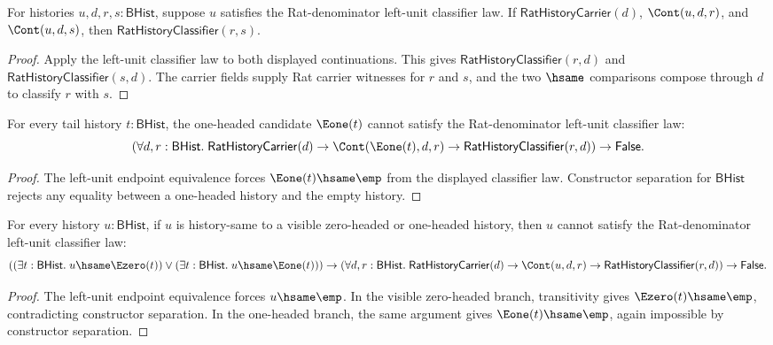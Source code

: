 \begin{lemma}
\label{lem:field-rat-denominator-continuation-left-unit-result-classifier}
For histories $u,d,r,s:\mathsf{BHist}$, suppose $u$ satisfies the
Rat-denominator left-unit classifier law. If $\mathsf{RatHistoryCarrier}(d)$,
$\Cont(u,d,r)$, and $\Cont(u,d,s)$, then
$\mathsf{RatHistoryClassifier}(r,s)$.
\end{lemma}
\begin{proof}
Apply the left-unit classifier law to both displayed continuations. This gives
$\mathsf{RatHistoryClassifier}(r,d)$ and
$\mathsf{RatHistoryClassifier}(s,d)$. The carrier fields supply Rat carrier
witnesses for $r$ and $s$, and the two $\hsame$ comparisons compose through
$d$ to classify $r$ with $s$.
\end{proof}

\begin{theorem}
\label{thm:field-rat-denominator-continuation-e1-left-unit-law-absurd}
For every tail history $t:\mathsf{BHist}$, the one-headed candidate
$\Eone(t)$ cannot satisfy the Rat-denominator left-unit classifier law:
$$
\left(
\forall d,r:\mathsf{BHist}.\;
\mathsf{RatHistoryCarrier}(d)\to
\Cont(\Eone(t),d,r)\to
\mathsf{RatHistoryClassifier}(r,d)
\right)
\to \mathsf{False}.
$$
\end{theorem}
\begin{proof}
The left-unit endpoint equivalence forces $\Eone(t)\hsame\emp$ from the
displayed classifier law. Constructor separation for $\mathsf{BHist}$ rejects
any equality between a one-headed history and the empty history.
\end{proof}

\begin{theorem}
\label{thm:field-rat-denominator-continuation-visible-left-unit-law-absurd}
For every history $u:\mathsf{BHist}$, if $u$ is history-same to a visible
zero-headed or one-headed history, then $u$ cannot satisfy the
Rat-denominator left-unit classifier law:
$$
\left(
(\exists t:\mathsf{BHist}.\; u\hsame\Ezero(t))
\lor
(\exists t:\mathsf{BHist}.\; u\hsame\Eone(t))
\right)
\to
\left(
\forall d,r:\mathsf{BHist}.\;
\mathsf{RatHistoryCarrier}(d)\to
\Cont(u,d,r)\to
\mathsf{RatHistoryClassifier}(r,d)
\right)
\to \mathsf{False}.
$$
\end{theorem}
\begin{proof}
The left-unit endpoint equivalence forces $u\hsame\emp$. In the visible
zero-headed branch, transitivity gives $\Ezero(t)\hsame\emp$, contradicting
constructor separation. In the one-headed branch, the same argument gives
$\Eone(t)\hsame\emp$, again impossible by constructor separation.
\end{proof}

